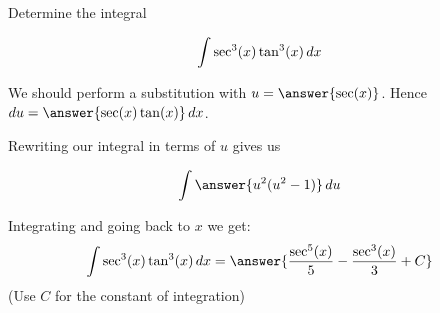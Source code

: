 \documentclass{ximera}
\author{Jason Miller}
\begin{document}
\begin{exercise}
Determine the integral

\[
\int \sec^{3}(x) \tan^{3}(x) \mathop{}\!d x
\]

We should perform a substitution with $u=\answer{ \sec(x)}$. Hence $\d u= \answer{ \sec(x)\tan(x)} \d x$. 

\begin{exercise}
Rewriting our integral in terms of $u$ gives us 

\[
\int \answer{u^{2} (u^{2}-1)} \d u
\]
\begin{exercise}
Integrating and going back to $x$ we get:
\[
\int \sec^{3}(x) \tan^{3}(x) \d x= \answer{  \frac{\sec^{5}(x)}{5} -\frac{ \sec^{3}(x)}{3} +C  }
\]
(Use $C$ for the constant of integration)
\end{exercise}
\end{exercise}
\end{exercise}
\end{document}
